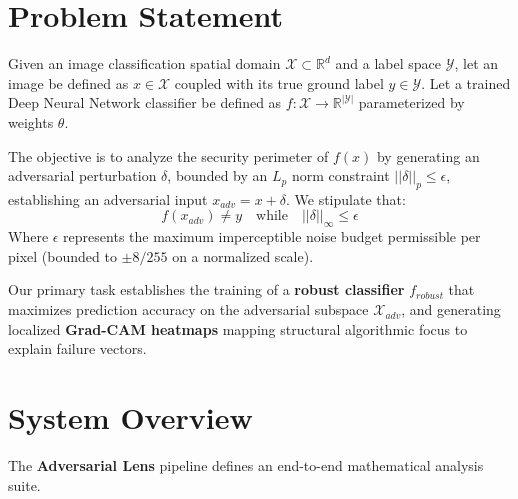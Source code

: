 \documentclass[12pt,a4paper]{article}
\begin{document}
\section{Problem Statement}
Given an image classification spatial domain $\mathcal{X} \subset \mathbb{R}^d$ and a label space $\mathcal{Y}$, let an image be defined as $x \in \mathcal{X}$ coupled with its true ground label $y \in \mathcal{Y}$. Let a trained Deep Neural Network classifier be defined as $f: \mathcal{X} \rightarrow \mathbb{R}^{|\mathcal{Y}|}$ parameterized by weights $\theta$.

The objective is to analyze the security perimeter of $f(x)$ by generating an adversarial perturbation $\delta$, bounded by an $L_p$ norm constraint $||\delta||_p \leq \epsilon$, establishing an adversarial input $x_{adv} = x + \delta$. We stipulate that:
\begin{equation}
    f(x_{adv}) \neq y \quad \text{while} \quad ||\delta||_\infty \leq \epsilon
\end{equation}
Where $\epsilon$ represents the maximum imperceptible noise budget permissible per pixel (bounded to $\pm 8/255$ on a normalized scale). 

Our primary task establishes the training of a \textbf{robust classifier} $f_{robust}$ that maximizes prediction accuracy on the adversarial subspace $\mathcal{X}_{adv}$, and generating localized \textbf{Grad-CAM heatmaps} mapping structural algorithmic focus to explain failure vectors.


\section{System Overview}
The \textbf{Adversarial Lens} pipeline defines an end-to-end mathematical analysis suite.
\end{document}
